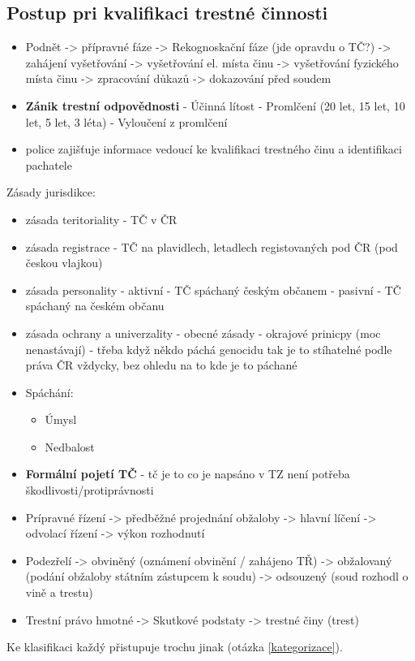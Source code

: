 \subsection{Postup pri kvalifikaci trestné činnosti}
\begin{itemize}
    \item Podnět -> přípravné fáze -> Rekognoskační fáze (jde opravdu o TČ?) -> zahájení vyšetřování ->
    vyšetřování el. místa činu -> vyšetřování fyzického místa činu -> zpracování důkazů -> dokazování
    před soudem
    \item \textbf{Zánik trestní odpovědnosti} - Účinná lítost - Promlčení (20 let, 15 let, 10 let, 5 let, 3 léta) - Vyloučení z promlčení
    \item police zajišťuje informace vedoucí ke kvalifikaci trestného činu a identifikaci pachatele
\end{itemize}
Zásady jurisdikce:
\begin{itemize}
    \item zásada teritoriality - TČ v ČR
    \item zásada registrace - TČ na plavidlech, letadlech registovaných pod ČR (pod českou vlajkou)
    \item zásada personality - aktivní - TČ spáchaný českým občanem - pasivní - TČ spáchaný na
    českém občanu
    \item zásada ochrany a univerzality - obecné zásady - okrajové prinicpy (moc nenastávají) - třeba
    když někdo páchá genocidu tak je to stíhatelné podle práva ČR vždycky, bez ohledu na to kde
    je to páchané
    \item Spáchání:
        \begin{itemize}
            \item Úmysl
            \item Nedbalost
        \end{itemize}
    \item \textbf{Formální pojetí TČ} - tč je to co je napsáno v TZ není potřeba škodlivosti/protiprávnosti
    \item Prípravné řízení -> předběžné projednání obžaloby -> hlavní líčení -> odvolací řízení -> výkon
    rozhodnutí
    \item Podezřelí -> obviněný (oznámení obvinění / zahájeno TŘ) -> obžalovaný (podání obžaloby státním
    zástupcem k soudu) -> odsouzený (soud rozhodl o vině a trestu)
    \item Trestní právo hmotné -> Skutkové podstaty -> trestné činy (trest)
\end{itemize}
Ke klasifikaci každý přistupuje trochu jinak (otázka \ref{kategorizace}).



